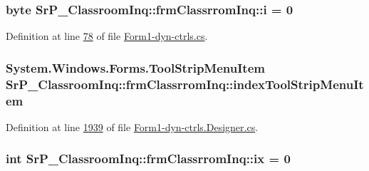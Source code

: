 \hypertarget{class_sr_p___classroom_inq_1_1frm_classrrom_inq_aa757c37b373c81fd9ac14b89ad217df0}{
\subsubsection[{i}]{\setlength{\rightskip}{0pt plus 5cm}byte {\bf \-Sr\-P\-\_\-\-Classroom\-Inq\-::frm\-Classrrom\-Inq\-::i} = 0}}
\label{class_sr_p___classroom_inq_1_1frm_classrrom_inq_aa757c37b373c81fd9ac14b89ad217df0}


\-Definition at line \hyperlink{_form1-dyn-ctrls_8cs_source_l00078}{78} of file \hyperlink{_form1-dyn-ctrls_8cs_source}{\-Form1-\/dyn-\/ctrls.\-cs}.

\hypertarget{class_sr_p___classroom_inq_1_1frm_classrrom_inq_a650650a8a1948b902bae347f3cdf9679}{
\subsubsection[{index\-Tool\-Strip\-Menu\-Item}]{\setlength{\rightskip}{0pt plus 5cm}\-System.\-Windows.\-Forms.\-Tool\-Strip\-Menu\-Item {\bf \-Sr\-P\-\_\-\-Classroom\-Inq\-::frm\-Classrrom\-Inq\-::index\-Tool\-Strip\-Menu\-Item}}}
\label{class_sr_p___classroom_inq_1_1frm_classrrom_inq_a650650a8a1948b902bae347f3cdf9679}


\-Definition at line \hyperlink{_form1-dyn-ctrls_8_designer_8cs_source_l01939}{1939} of file \hyperlink{_form1-dyn-ctrls_8_designer_8cs_source}{\-Form1-\/dyn-\/ctrls.\-Designer.\-cs}.

\hypertarget{class_sr_p___classroom_inq_1_1frm_classrrom_inq_a1f5209850965916fddf21b2409e6204a}{
\subsubsection[{ix}]{\setlength{\rightskip}{0pt plus 5cm}int {\bf \-Sr\-P\-\_\-\-Classroom\-Inq\-::frm\-Classrrom\-Inq\-::ix} = 0}}
\label{class_sr_p___classroom_inq_1_1frm_classrrom_inq_a1f5209850965916fddf21b2409e6204a}


